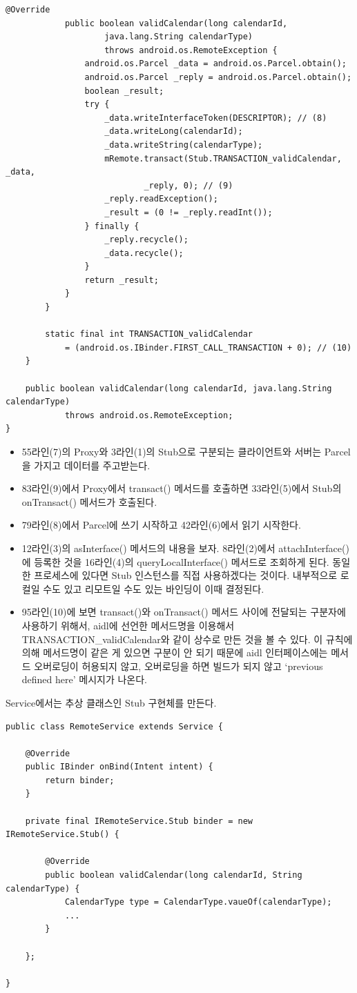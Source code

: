 \begin{lstlisting}[frame=single]
			@Override
			public boolean validCalendar(long calendarId,
					java.lang.String calendarType)
					throws android.os.RemoteException {
				android.os.Parcel _data = android.os.Parcel.obtain();
				android.os.Parcel _reply = android.os.Parcel.obtain();
				boolean _result;
				try {
					_data.writeInterfaceToken(DESCRIPTOR); // (8)
					_data.writeLong(calendarId);
					_data.writeString(calendarType);
					mRemote.transact(Stub.TRANSACTION_validCalendar, _data, 
							_reply, 0); // (9)
					_reply.readException();
					_result = (0 != _reply.readInt());
				} finally {
					_reply.recycle();
					_data.recycle();
				}
				return _result;
			}
		}

		static final int TRANSACTION_validCalendar 
			= (android.os.IBinder.FIRST_CALL_TRANSACTION + 0); // (10)
	}

	public boolean validCalendar(long calendarId, java.lang.String calendarType)
			throws android.os.RemoteException;
}
\end{lstlisting}
\begin{itemize}
\item 55라인(7)의 Proxy와 3라인(1)의 Stub으로 구분되는 클라이언트와 서버는 Parcel을 가지고 데이터를 주고받는다. 

\item 83라인(9)에서 Proxy에서 transact() 메서드를 호출하면 33라인(5)에서 Stub의 onTransact() 메서드가 호출된다.

\item 79라인(8)에서 Parcel에 쓰기 시작하고 42라인(6)에서 읽기 시작한다.

\item 12라인(3)의 asInterface() 메서드의 내용을 보자. 8라인(2)에서 attachInterface()에 등록한 것을 16라인(4)의 queryLocalInterface() 메서드로 조회하게 된다. 동일한 프로세스에 있다면 Stub 인스턴스를 직접 사용하겠다는 것이다. 내부적으로 로컬일 수도 있고 리모트일 수도 있는 바인딩이 이때 결정된다.

\item 95라인(10)에 보면 transact()와 onTransact() 메서드 사이에 전달되는 구분자에 사용하기 위해서, aidl에 선언한 메서드명을 이용해서 TRANSACTION\_validCalendar와 같이 상수로 만든 것을 볼 수 있다. 
이 규칙에 의해 메서드명이 같은 게 있으면 구분이 안 되기 때문에 aidl 인터페이스에는 메서드 오버로딩이 허용되지 않고, 오버로딩을 하면 빌드가 되지 않고 `previous defined here' 메시지가 나온다.
\end{itemize}

Service에서는 추상 클래스인 Stub 구현체를 만든다.
\begin{lstlisting}[frame=single]
public class RemoteService extends Service {

 	@Override
    public IBinder onBind(Intent intent) {
		return binder;
	}
    	
	private final IRemoteService.Stub binder = new IRemoteService.Stub() {
	
		@Override
        public boolean validCalendar(long calendarId, String calendarType) {
			CalendarType type = CalendarType.vaueOf(calendarType);
            ...
        }
        
    }; 
    
}       	
\end{lstlisting}

